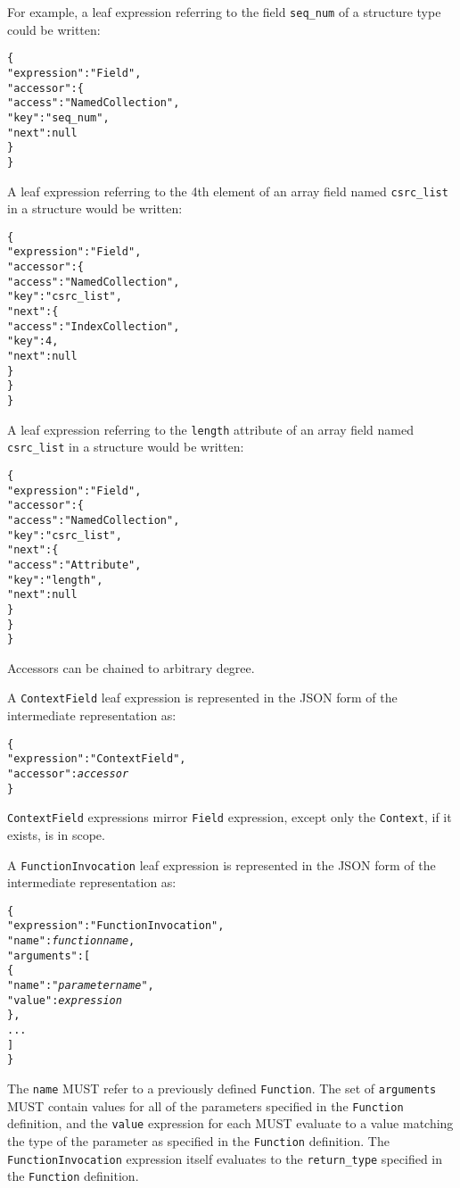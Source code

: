 \documentclass[10pt,twocolumn,a4paper]{article}
\newcommand{\code}[1]{\texttt{#1}}
\begin{document}
For example, a leaf expression referring to the field \code{seq\_num} of a
structure type could be written:
\footnotesize
\begin{alltt}
  \{
    "expression" : "Field",
    "accessor" : \{
      "access" : "NamedCollection",
      "key"    : "seq\_num",
      "next"   : null
    \}
  \}
\end{alltt}
\normalsize
A leaf expression referring to the 4th element of an array field named
\code{csrc\_list} in a structure would be written:
\footnotesize
\begin{alltt}
  \{
    "expression" : "Field",
    "accessor" : \{
      "access" : "NamedCollection",
      "key"    : "csrc\_list",
      "next"   : \{
        "access" : "IndexCollection",
        "key" : 4,
        "next" : null
      \}
    \}
  \}
\end{alltt}
\normalsize
A leaf expression referring to the \code{length} attribute of an array
field named \code{csrc\_list} in a structure would be written:
\footnotesize
\begin{alltt}
  \{
    "expression" : "Field",
    "accessor" : \{
      "access" : "NamedCollection",
      "key"    : "csrc\_list",
      "next"   : \{
        "access" : "Attribute",
        "key"    : "length",
        "next"   : null
      \}
    \}
  \}
\end{alltt}
\normalsize

Accessors can be chained to arbitrary degree.

A \code{ContextField} leaf expression is represented in the JSON form of the
intermediate representation as:
\footnotesize
\begin{alltt}
  \{
    "expression"   : "ContextField",
    "accessor"     : \emph{accessor}
  \}
\end{alltt}
\normalsize
\code{ContextField} expressions mirror \code{Field} expression, except only the
\code{Context}, if it exists, is in scope.

A \code{FunctionInvocation} leaf expression is represented in the JSON form of the
intermediate representation as:
\footnotesize
\begin{alltt}
  \{
    "expression"   : "FunctionInvocation",
    "name"         : \emph{function name},
    "arguments"    : [
      \{
        "name"  : "\emph{parameter name}",
        "value" : \emph{expression}
      \},
      ...
    ]
  \}
\end{alltt}
\normalsize
The \code{name} MUST refer to a previously defined \code{Function}. The set
of \code{arguments} MUST contain values for all of the parameters specified
in the \code{Function} definition, and the \code{value} expression for each
MUST evaluate to a value matching the type of the parameter as specified in
the \code{Function} definition. The \code{FunctionInvocation} expression
itself evaluates to the \code{return\_type} specified in the
\code{Function} definition.
\end{document}
